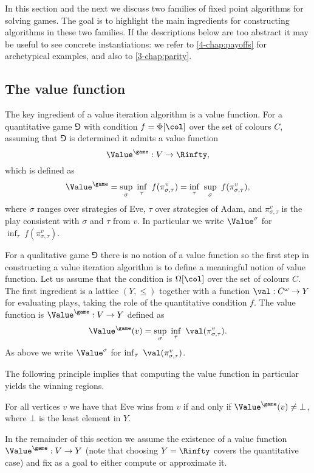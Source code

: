 In this section and the next we discuss two families of fixed point algorithms for solving games.
The goal is to highlight the main ingredients for constructing algorithms in these two families.
If the descriptions below are too abstract it may be useful to see concrete instantiations: 
we refer to \cref{4-chap:payoffs} for archetypical examples, and also to \cref{3-chap:parity}.

\subsection*{The value function}
The key ingredient of a value iteration algorithm is a value function.
For a quantitative game $\Game$ with condition $f = \Phi[\col]$ over the set of colours $C$, 
assuming that $\Game$ is determined it admits a value function
\[
\Value^{\game} : V \to \Rinfty,
\]
which is defined as 
\[
\Value^{\game} = \sup_{\sigma}\ \inf_{\tau}\ f(\pi_{\sigma,\tau}^v) = \inf_{\tau}\ \sup_{\sigma}\ f(\pi_{\sigma,\tau}^v),
\]
where $\sigma$ ranges over strategies of Eve, $\tau$ over strategies of Adam, 
and $\pi_{\sigma,\tau}^v$ is the play consistent with $\sigma$ and $\tau$ from $v$.
In particular we write $\Value^{\sigma}$ for $\inf_{\tau}\ f(\pi_{\sigma,\tau}^v)$.

For a qualitative game $\Game$ there is no notion of a value function so the first step in constructing a value iteration
algorithm is to define a meaningful notion of value function.
Let us assume that the condition is $\Omega[\col]$ over the set of colours $C$.
The first ingredient is a lattice $(Y,\le)$ together with a function $\val : C^\omega \to Y$ for evaluating plays, taking the role of the quantitative condition $f$.
The value function is $\Value^{\game} : V \to Y$ defined as
\[
\Value^{\game}(v) = \sup_{\sigma}\ \inf_{\tau}\ \val(\pi_{\sigma,\tau}^v).
\]
As above we write $\Value^{\sigma}$ for $\inf_{\tau}\ \val(\pi_{\sigma,\tau}^v)$.

The following principle implies that computing the value function in particular yields the winning regions.

\begin{property}
\label{1-property:characterisation_winning_regions}
For all vertices $v$ we have that Eve wins from $v$ if and only if $\Value^{\game}(v) \neq \bot$, where $\bot$ is the least element in $Y$.
\end{property}

In the remainder of this section we assume the existence of a value function $\Value^{\game} : V \to Y$ (note that choosing $Y = \Rinfty$ covers the quantitative case) and fix as a goal to either compute or approximate it.

